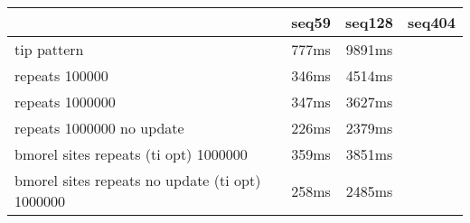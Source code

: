 \begin{tabular}{|l|c|c|c|}
\hline
 & seq59 & seq128 & seq404  \\
\hline
tip pattern & 777ms & 9891ms\\
\hline
repeats 100000 & 346ms & 4514ms\\
\hline
repeats 1000000 & 347ms & 3627ms\\
\hline
repeats 1000000 no update & 226ms & 2379ms\\
\hline
bmorel sites repeats (ti opt) 1000000 & 359ms & 3851ms\\
\hline
bmorel sites repeats no update (ti opt) 1000000 & 258ms & 2485ms\\
\hline
\end{tabular}
